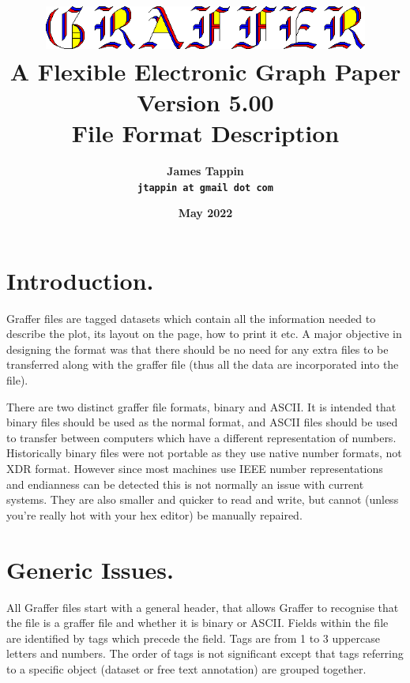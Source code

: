 \documentclass[english]{article}
\begin{document}
\title{\includegraphics[width=0.80\textwidth]{logo} \\
A Flexible Electronic Graph Paper\\
Version 5.00\\
File Format Description}

\author{\textsf{\textbf{\Large James Tappin}}\\
\texttt{\textbf{\Large jtappin at gmail dot com}}}

\date{\textsf{\textbf{\large May 2022}}}

\maketitle

\tableofcontents{}
\section{Introduction.}

Graffer files are tagged datasets which contain all the information
needed to describe the plot, its layout on the page, how to print
it etc. A major objective in designing the format was that there should
be no need for any extra files to be transferred along with the graffer
file (thus all the data are incorporated into the file).

There are two distinct graffer file formats, binary and ASCII. It is
intended that binary files should be used as the normal format, and
ASCII files should be used to transfer between computers which have a
different representation of numbers. Historically binary files were not
portable as they use native number formats, not XDR format. However
since most machines use IEEE number representations and endianness can
be detected this is not normally an issue with current systems. They
are also smaller and quicker to read and write, but cannot (unless
you're really hot with your hex editor) be manually repaired.


\section{Generic Issues.}

All Graffer files start with a general header, that allows Graffer
to recognise that the file is a graffer file and whether it is binary
or ASCII. Fields within the file are identified by tags which precede
the field. Tags are from 1 to 3 uppercase letters and numbers. The
order of tags is not significant except that tags referring to a specific
object (dataset or free text annotation) are grouped together.
\end{document}
